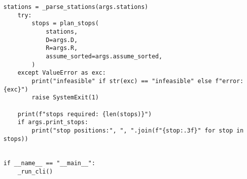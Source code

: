 \begin{lstlisting}[caption={Greedy EV planner implementation},label={lst:ev-greedy}]
    stations = _parse_stations(args.stations)
    try:
        stops = plan_stops(
            stations,
            D=args.D,
            R=args.R,
            assume_sorted=args.assume_sorted,
        )
    except ValueError as exc:
        print("infeasible" if str(exc) == "infeasible" else f"error: {exc}")
        raise SystemExit(1)

    print(f"stops required: {len(stops)}")
    if args.print_stops:
        print("stop positions:", ", ".join(f"{stop:.3f}" for stop in stops))


if __name__ == "__main__":
    _run_cli()
\end{lstlisting}
